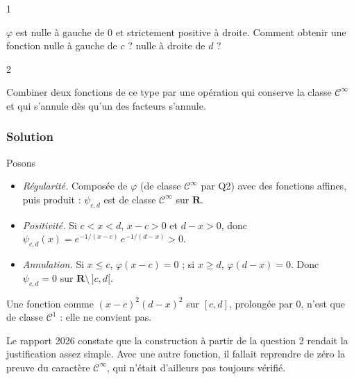\documentclass[11pt,a4paper]{article}
\providecommand{\tightlist}{\setlength{\itemsep}{0pt}\setlength{\parskip}{0pt}}
\newcommand{\equationajustee}[1]{%
  \sbox{\boiteequation}{$\displaystyle #1$}%
  \ifdim\wd\boiteequation>\linewidth
    \[\resizebox{\linewidth}{!}{\usebox{\boiteequation}}\]%
  \else
    \[#1\]%
  \fi}
\begin{document}
\begin{indication}{1}

\(\varphi\) est nulle à gauche de \(0\) et strictement positive à droite. Comment obtenir une fonction nulle à gauche de \(c\) ? nulle à droite de \(d\) ?

\end{indication}

\begin{indication}{2}

Combiner deux fonctions de ce type par une opération qui conserve la classe \(\mathcal C^\infty\) et qui s'annule dès qu'un des facteurs s'annule.

\end{indication}

\hypertarget{solution-2}{%
\subsubsection{Solution}\label{solution-2}}

Posons
\equationajustee{\boxed{\psi_{c,d}(x)=\varphi(x-c)\,\varphi(d-x)\qquad(x\in\mathbf R).}}

\begin{itemize}
\tightlist
\item
  \emph{Régularité.} Composée de \(\varphi\) (de classe \(\mathcal C^\infty\) par Q2) avec des fonctions affines, puis produit : \(\psi_{c,d}\) est de classe \(\mathcal C^\infty\) sur \(\mathbf R\).
\item
  \emph{Positivité.} Si \(c<x<d\), \(x-c>0\) et \(d-x>0\), donc \(\psi_{c,d}(x)=e^{-1/(x-c)}\,e^{-1/(d-x)}>0\).
\item
  \emph{Annulation.} Si \(x\le c\), \(\varphi(x-c)=0\) ; si \(x\ge d\), \(\varphi(d-x)=0\). Donc \(\psi_{c,d}=0\) sur \(\mathbf R\setminus\,]c,d[\).
\end{itemize}

\begin{piege}

Une fonction comme \((x-c)^2(d-x)^2\) sur \([c,d]\), prolongée par \(0\), n'est que de classe \(\mathcal C^1\) : elle ne convient pas.

\end{piege}

\begin{jury}

Le rapport 2026 constate que la construction à partir de la question 2 rendait la justification assez simple. Avec une autre fonction, il fallait reprendre de zéro la preuve du caractère \(\mathcal C^\infty\), qui n'était d'ailleurs pas toujours vérifié.

\end{jury}
\end{document}
